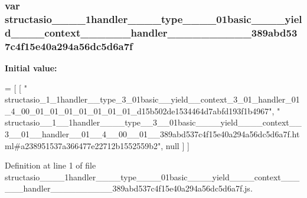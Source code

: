 \subsubsection[{structasio\+\_\+\+\_\+1\+\_\+\+\_\+1handler\+\_\+\+\_\+\+\_\+\+\_\+type\+\_\+\+\_\+3\+\_\+\+\_\+01basic\+\_\+\+\_\+\+\_\+\+\_\+yield\+\_\+\+\_\+\+\_\+\+\_\+context\+\_\+\+\_\+3\+\_\+\+\_\+01\+\_\+\+\_\+handler\+\_\+\+\_\+01\+\_\+\+\_\+4\+\_\+\+\_\+00\+\_\+\+\_\+01\+\_\+\+\_\+389abd537c4f15e40a294a56dc5d6a7f}]{\setlength{\rightskip}{0pt plus 5cm}var structasio\+\_\+\+\_\+\_\+\+\_\+1handler\+\_\+\+\_\+\+\_\+\+\_\+type\+\_\+\+\_\+\_\+\+\_\+01basic\+\_\+\+\_\+\+\_\+\+\_\+yield\+\_\+\+\_\+\+\_\+\+\_\+context\+\_\+\+\_\+\_\+\+\_\+\_\+\+\_\+handler\+\_\+\+\_\+\_\+\+\_\+\_\+\+\_\+\_\+\+\_\+\_\+\+\_\+389abd537c4f15e40a294a56dc5d6a7f}\label{structasio____1____1handler________type____3____01basic________yield________context____3____01__cbe8aed099d176dd7c5e0bd0b03e6ead_a1aeded69876facb9f0f1e2a7f267b7ef}
{\bfseries Initial value\+:}
\begin{DoxyCode}
=
[
    [ \textcolor{stringliteral}{"
      structasio\_1\_1handler\_\_type\_3\_01basic\_\_yield\_\_context\_3\_01\_handler\_01\_4\_00\_01\_01\_01\_01\_01\_01\_01\_d15b502de1534464d7abfd193f1b4967"}, \textcolor{stringliteral}{"
      structasio\_\_1\_\_1handler\_\_\_\_type\_\_3\_\_01basic\_\_\_\_yield\_\_\_\_context\_\_3\_\_01\_\_handler\_\_01\_\_4\_\_00\_\_01\_\_389abd537c4f15e40a294a56dc5d6a7f.html#a238951537a366477e22712b1552559b2"}, null ]
]
\end{DoxyCode}


Definition at line 1 of file structasio\+\_\+\+\_\+\_\+\+\_\+1handler\+\_\+\+\_\+\+\_\+\+\_\+type\+\_\+\+\_\+\_\+\+\_\+01basic\+\_\+\+\_\+\+\_\+\+\_\+yield\+\_\+\+\_\+\+\_\+\+\_\+context\+\_\+\+\_\+\_\+\+\_\+\_\+\+\_\+handler\+\_\+\+\_\+\_\+\+\_\+\_\+\+\_\+\_\+\+\_\+\_\+\+\_\+389abd537c4f15e40a294a56dc5d6a7f.\+js.

